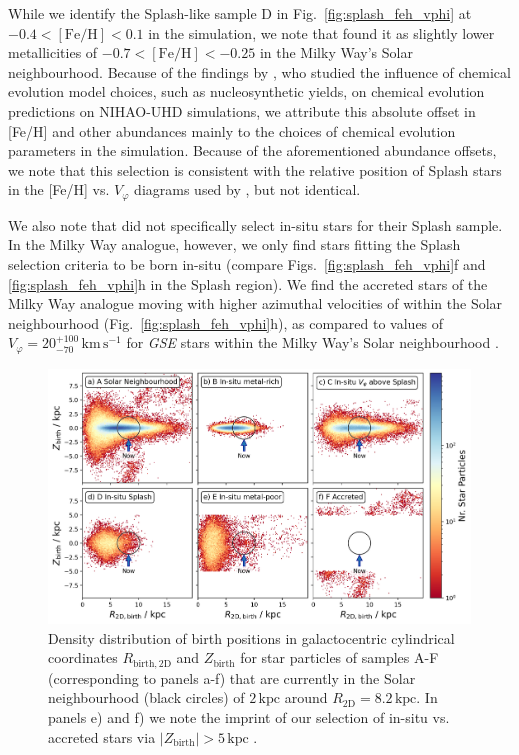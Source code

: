 \documentclass[fleqn,usenatbib]{mnras}
\begin{document}
While we identify the Splash-like sample D in Fig.~\ref{fig:splash_feh_vphi} at $-0.4 < \mathrm{[Fe/H]} < 0.1$ in the simulation, we note that \citet{Belokurov2020} found it as slightly lower metallicities of $-0.7 < \mathrm{[Fe/H]} < -0.25$ in the Milky Way's Solar neighbourhood. Because of the findings by \citet{Buck2021}, who studied the influence of chemical evolution model choices, such as nucleosynthetic yields, on chemical evolution predictions on NIHAO-UHD simulations, we attribute this absolute offset in [Fe/H] and other abundances mainly to the choices of chemical evolution parameters in the simulation. Because of the aforementioned abundance offsets, we note that this selection is consistent with the relative position of Splash stars in the [Fe/H] vs. $V_\varphi$ diagrams used by \citet{Belokurov2020}, but not identical.

We also note that \citet{Belokurov2020} did not specifically select in-situ stars for their Splash sample. In the Milky Way analogue, however, we only find stars fitting the Splash selection criteria to be born in-situ (compare Figs.~\ref{fig:splash_feh_vphi}f and \ref{fig:splash_feh_vphi}h in the Splash region). We find the accreted stars of the Milky Way analogue moving with higher azimuthal velocities of  within the Solar neighbourhood (Fig.~\ref{fig:splash_feh_vphi}h), as compared to values of $V_\varphi = 20_{-70}^{+100}\,\mathrm{km\,s^{-1}}$ for \textit{GSE} stars within the Milky Way's Solar neighbourhood \citep{Buder2022}.

\begin{figure}
    \centering
    \includegraphics[width=0.997\textwidth]{figures/splash_rbirth_zbirth}
    \caption{Density distribution of birth positions in galactocentric cylindrical coordinates $R_\mathrm{birth, 2D}$ and $Z_\mathrm{birth}$ for star particles of samples A-F (corresponding to panels a-f) that are currently in the Solar neighbourhood (black circles) of $2\,\mathrm{kpc}$ around $R_\mathrm{2D} = 8.2\,\mathrm{kpc}$. In panels e) and f) we note the imprint of our selection of in-situ vs. accreted stars via $\vert Z_\mathrm{birth} \vert > 5\,\mathrm{kpc}$  \href{https://github.com/svenbuder/golden_thread_II/tree/main/figures}{\faGithub}.}
    \label{fig:splash_rbirth_zbirth}
\end{figure}
\end{document}
